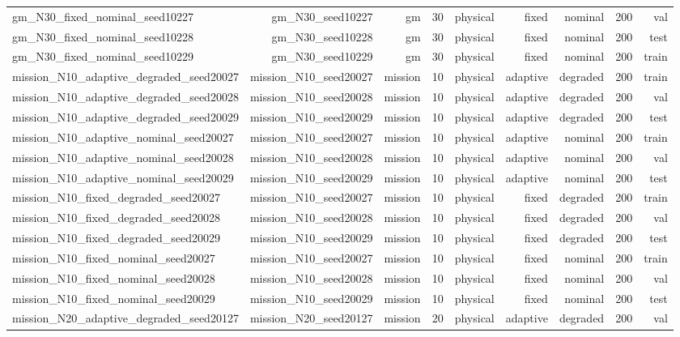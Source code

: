 \begin{tabular}{lrrrrrrrr}
gm\_N30\_fixed\_nominal\_seed10227 & gm\_N30\_seed10227 & gm & 30 & physical & fixed & nominal & 200 & val \\
gm\_N30\_fixed\_nominal\_seed10228 & gm\_N30\_seed10228 & gm & 30 & physical & fixed & nominal & 200 & test \\
gm\_N30\_fixed\_nominal\_seed10229 & gm\_N30\_seed10229 & gm & 30 & physical & fixed & nominal & 200 & train \\
mission\_N10\_adaptive\_degraded\_seed20027 & mission\_N10\_seed20027 & mission & 10 & physical & adaptive & degraded & 200 & train \\
mission\_N10\_adaptive\_degraded\_seed20028 & mission\_N10\_seed20028 & mission & 10 & physical & adaptive & degraded & 200 & val \\
mission\_N10\_adaptive\_degraded\_seed20029 & mission\_N10\_seed20029 & mission & 10 & physical & adaptive & degraded & 200 & test \\
mission\_N10\_adaptive\_nominal\_seed20027 & mission\_N10\_seed20027 & mission & 10 & physical & adaptive & nominal & 200 & train \\
mission\_N10\_adaptive\_nominal\_seed20028 & mission\_N10\_seed20028 & mission & 10 & physical & adaptive & nominal & 200 & val \\
mission\_N10\_adaptive\_nominal\_seed20029 & mission\_N10\_seed20029 & mission & 10 & physical & adaptive & nominal & 200 & test \\
mission\_N10\_fixed\_degraded\_seed20027 & mission\_N10\_seed20027 & mission & 10 & physical & fixed & degraded & 200 & train \\
mission\_N10\_fixed\_degraded\_seed20028 & mission\_N10\_seed20028 & mission & 10 & physical & fixed & degraded & 200 & val \\
mission\_N10\_fixed\_degraded\_seed20029 & mission\_N10\_seed20029 & mission & 10 & physical & fixed & degraded & 200 & test \\
mission\_N10\_fixed\_nominal\_seed20027 & mission\_N10\_seed20027 & mission & 10 & physical & fixed & nominal & 200 & train \\
mission\_N10\_fixed\_nominal\_seed20028 & mission\_N10\_seed20028 & mission & 10 & physical & fixed & nominal & 200 & val \\
mission\_N10\_fixed\_nominal\_seed20029 & mission\_N10\_seed20029 & mission & 10 & physical & fixed & nominal & 200 & test \\
mission\_N20\_adaptive\_degraded\_seed20127 & mission\_N20\_seed20127 & mission & 20 & physical & adaptive & degraded & 200 & val \\

\end{tabular}
